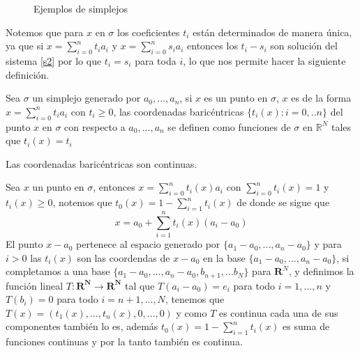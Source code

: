\begin{figure}[h]
\centering
{}
\caption{Ejemplos de simplejos}
\end{figure}

Notemos que para $x$ en $\sigma$ los coeficientes $t_i$ están determinados de manera única, ya que si $x = \sum_{i=0}^{n}t_ia_i$ y $x = \sum_{i=0}^{n}s_ia_i$ entonces los $t_i-s_i$ son solución del sistema \ref{s2} por lo que $t_i=s_i$ para toda $i$, lo que nos permite hacer la 
siguiente definición.
\begin{Defi}
Sea $\sigma$ un simplejo generado por $a_0,...,a_n$, si $x$ es un punto en $\sigma$, $x$ es de la forma $x = \sum_{i=0}^{n}t_ia_i$ con $t_i\geqslant 0$, las coordenadas baricéntricas $\{t_i(x):i = 0,..n\}$ del punto $x$ en $\sigma$ con respecto a $a_0,...,a_n$ se definen como funciones de $\sigma$ en $\mathbb{R}^{N}$ tales que $t_i(x) = t_i$
\end{Defi}
\begin{Prop}
Las coordenadas baricéntricas son continuas.
\end{Prop}
\begin{Dem}

Sea $x$ un punto en $\sigma$, entonces $x=\sum_{i=0}^{n}t_i(x)a_i$ con $\sum_{i=0}^{n}t_i(x)=1$ y 
$t_i(x)\geq 0$, notemos que $t_0(x) = 1-\sum_{i=1}^{n}t_i(x)$ de donde se sigue que 
\begin{equation}
x = a_0 + \sum_{i=1}^{n}t_i(x)(a_i-a_0)
\end{equation}
El punto $x-a_0$ pertenece al espacio generado por $\{a_1-a_0,...,a_n-a_0\}$ y para $i>0$ las $t_i(x)$  son las coordendas de $x-a_0$ en la base $\{a_1-a_0,...,a_n-a_0\}$, si completamos a una base $\{a_1-a_0,...,a_n-a_0,b_{n+1},...b_N\}$ para $\mathbf{R}^N$,  y definimos la función lineal $T\colon \mathbf{R^N}\rightarrow \mathbf{R^N}$ tal que $T(a_i-a_0) = e_i$ para todo $i=1,...,n$ y $T(b_i) = 0$ para todo $i = n+1,...,N$, tenemos que $T(x) = (t_1(x),...,t_n(x),0,...,0)$ y como $T$ es continua cada una de sus componentes también lo es, además $t_0(x) = 1-\sum_{i=1}^{n}t_i(x)$ es suma de funciones continuas y por la tanto también es continua. 
\end{Dem}
